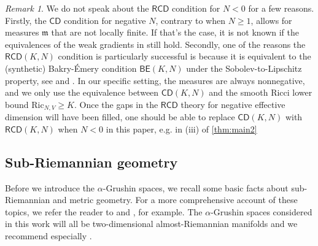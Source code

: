 \documentclass[11pt,twoside,a4paper]{article}
\newcommand{\red}{\color{red}}
\newcommand{\cd}{\mathsf{CD}}
\newcommand{\RCD}{\mathsf{RCD}}
\theoremstyle{theorem}
\theoremstyle{definition}
\theoremstyle{remark}
\newtheorem{remark}[theorem]{Remark}
\theoremstyle{proof}
\begin{document}
\begin{remark}
    We do not speak about the $\mathsf{RCD}$ condition for $N < 0$ for a few reasons. Firstly, the $\mathsf{CD}$ condition for negative $N$, contrary to when $N \geq 1$, allows for measures $\mathfrak{m}$ that are not locally finite. If that's the case, it is not known if the equivalences of the weak gradients in \cite[Sections 7 and 8]{Ambrosio2013} still hold. Secondly, one of the reasons the $\mathsf{RCD}(K, N)$ condition is  particularly successful is because it is equivalent to the (synthetic) Bakry-\'Emery condition $\mathsf{BE}(K, N)$ under the Sobolev-to-Lipschitz property, see \cite{Erbar2015} and \cite{Ambrosio2015}.
    In our specific setting, the measures are always nonnegative, and we only use the equivalence between $\cd(K,N)$ and the smooth Ricci lower bound $\mathrm{Ric}_{N,V} \geq K$.
    Once the gaps in the $\mathsf{RCD}$ theory for negative effective dimension will have been filled, one should be able to replace $\mathsf{CD}(K, N)$ with $\mathsf{RCD}(K, N)$ when $N < 0$ in this paper, e.g. in (iii) of \cref{thm:main2}
\end{remark}


\subsection{Sub-Riemannian geometry}
\label{subsection:subR}

Before we introduce the $\alpha$-Grushin spaces, we recall some basic facts about sub-Riemannian and metric geometry. For a more comprehensive account of these topics, we refer the reader to \cite{ABB-srgeom} and \cite{burago-burago-sergei2001}, for example.
The $\alpha$-Grushin spaces considered in this work will all be two-dimensional almost-Riemannian manifolds and we recommend especially \cite[Chapter 9]{ABB-srgeom}.
\end{document}
